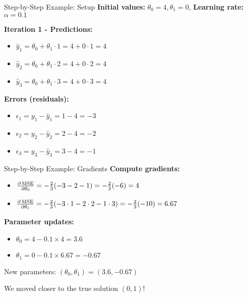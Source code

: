 \documentclass[usenames,dvipsnames]{beamer}
\begin{document}
  \begin{frame}{Step-by-Step Example: Setup}
    \textbf{Initial values:} $\theta_0 = 4, \theta_1 = 0$, \textbf{Learning rate:} $\alpha = 0.1$
    
    \pause
    \textbf{Iteration 1 - Predictions:}
    \begin{itemize}[<+->]
        \item $\hat{y}_1 = \theta_0 + \theta_1 \cdot 1 = 4 + 0 \cdot 1 = 4$
        \item $\hat{y}_2 = \theta_0 + \theta_1 \cdot 2 = 4 + 0 \cdot 2 = 4$ 
        \item $\hat{y}_3 = \theta_0 + \theta_1 \cdot 3 = 4 + 0 \cdot 3 = 4$
    \end{itemize}
    
    \pause
    \textbf{Errors (residuals):}
    \begin{itemize}[<+->]
        \item $\epsilon_1 = y_1 - \hat{y}_1 = 1 - 4 = -3$
        \item $\epsilon_2 = y_2 - \hat{y}_2 = 2 - 4 = -2$
        \item $\epsilon_3 = y_3 - \hat{y}_3 = 3 - 4 = -1$
    \end{itemize}
  \end{frame}

  \begin{frame}{Step-by-Step Example: Gradients}
    \textbf{Compute gradients:}
    \begin{itemize}[<+->]
        \item $\frac{\partial \operatorname{MSE}}{\partial \theta_0} = -\frac{2}{3}(-3-2-1) = -\frac{2}{3}(-6) = 4$
        \item $\frac{\partial \operatorname{MSE}}{\partial \theta_1} = -\frac{2}{3}(-3 \cdot 1 - 2 \cdot 2 - 1 \cdot 3) = -\frac{2}{3}(-10) = 6.67$
    \end{itemize}
    
    \pause
    \textbf{Parameter updates:}
    \begin{itemize}[<+->]
        \item $\theta_0 = 4 - 0.1 \times 4 = 3.6$
        \item $\theta_1 = 0 - 0.1 \times 6.67 = -0.67$
    \end{itemize}
    
    \pause
    \begin{keypointsbox}{}
    New parameters: $(\theta_0, \theta_1) = (3.6, -0.67)$
    
    We moved closer to the true solution $(0, 1)$!
    \end{keypointsbox}
  \end{frame}
\end{document}
